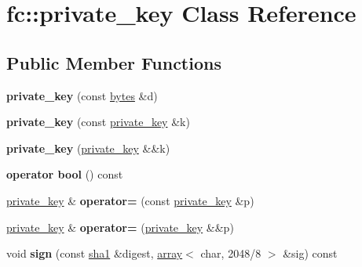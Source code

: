 \hypertarget{classfc_1_1private__key}{}\section{fc\+:\+:private\+\_\+key Class Reference}
\label{classfc_1_1private__key}
\subsection*{Public Member Functions}
\begin{DoxyCompactItemize}
\item 
\mbox{\label{classfc_1_1private__key_a73053212a56464289eec33ae300b90b2}} 
{\bfseries private\+\_\+key} (const \mbox{\hyperlink{classstd_1_1vector}{bytes}} \&d)
\item 
\mbox{\label{classfc_1_1private__key_a1ac0c2ac5fc20041916d37e0b2b0e1d2}} 
{\bfseries private\+\_\+key} (const \mbox{\hyperlink{classfc_1_1private__key}{private\+\_\+key}} \&k)
\item 
\mbox{\label{classfc_1_1private__key_a7a72ade3f1127774d958843137a3f88e}} 
{\bfseries private\+\_\+key} (\mbox{\hyperlink{classfc_1_1private__key}{private\+\_\+key}} \&\&k)
\item 
\mbox{\label{classfc_1_1private__key_a8e21d7e6d20803393d559c7a96a7ec38}} 
{\bfseries operator bool} () const
\item 
\mbox{\label{classfc_1_1private__key_ae564ed11a0160d4ba2db19ae4beb8dae}} 
\mbox{\hyperlink{classfc_1_1private__key}{private\+\_\+key}} \& {\bfseries operator=} (const \mbox{\hyperlink{classfc_1_1private__key}{private\+\_\+key}} \&p)
\item 
\mbox{\label{classfc_1_1private__key_a7a5b884a0f9b73a323959494a0740cf9}} 
\mbox{\hyperlink{classfc_1_1private__key}{private\+\_\+key}} \& {\bfseries operator=} (\mbox{\hyperlink{classfc_1_1private__key}{private\+\_\+key}} \&\&p)
\item 
\mbox{\label{classfc_1_1private__key_abbbae8a17dcaae3e1239757227c00f69}} 
void {\bfseries sign} (const \mbox{\hyperlink{classfc_1_1sha1}{sha1}} \&digest, \mbox{\hyperlink{classfc_1_1array}{array}}$<$ char, 2048/8 $>$ \&sig) const

\end{DoxyCompactItemize}
